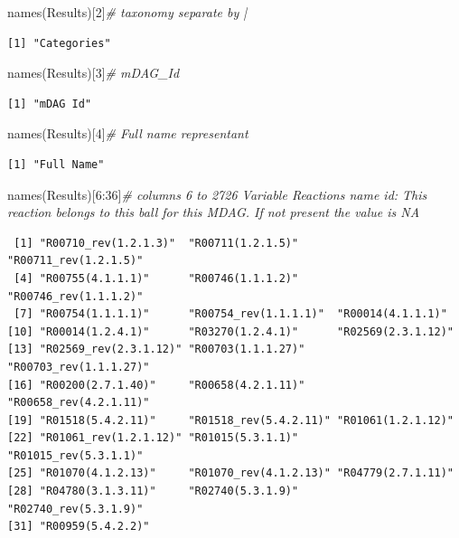 \documentclass[
  letterpaper,
  DIV=11,
  numbers=noendperiod]{scrreprt}
\newenvironment{Shaded}{}{}
\newcommand{\CommentTok}[1]{\textcolor[rgb]{0.36,0.39,0.44}{\textit{#1}}}
\newcommand{\DecValTok}[1]{\textcolor[rgb]{0.82,0.60,0.40}{#1}}
\newcommand{\FunctionTok}[1]{\textcolor[rgb]{0.38,0.69,0.94}{#1}}
\newcommand{\NormalTok}[1]{\textcolor[rgb]{0.67,0.70,0.75}{#1}}
\newcommand{\SpecialCharTok}[1]{\textcolor[rgb]{0.34,0.71,0.76}{#1}}
\begin{document}
\begin{Shaded}
\begin{Highlighting}[]
\FunctionTok{names}\NormalTok{(Results)[}\DecValTok{2}\NormalTok{]}\CommentTok{\# taxonomy separate by |}
\end{Highlighting}
\end{Shaded}

\begin{verbatim}
[1] "Categories"
\end{verbatim}

\begin{Shaded}
\begin{Highlighting}[]
\FunctionTok{names}\NormalTok{(Results)[}\DecValTok{3}\NormalTok{]}\CommentTok{\# mDAG\_Id }
\end{Highlighting}
\end{Shaded}

\begin{verbatim}
[1] "mDAG Id"
\end{verbatim}

\begin{Shaded}
\begin{Highlighting}[]
\FunctionTok{names}\NormalTok{(Results)[}\DecValTok{4}\NormalTok{]}\CommentTok{\# Full name representant}
\end{Highlighting}
\end{Shaded}

\begin{verbatim}
[1] "Full Name"
\end{verbatim}

\begin{Shaded}
\begin{Highlighting}[]
\FunctionTok{names}\NormalTok{(Results)[}\DecValTok{6}\SpecialCharTok{:}\DecValTok{36}\NormalTok{]}\CommentTok{\# columns 6 to 2726  Variable Reactions name id: This reaction belongs to this ball for this MDAG. If not present the value is NA}
\end{Highlighting}
\end{Shaded}

\begin{verbatim}
 [1] "R00710_rev(1.2.1.3)"  "R00711(1.2.1.5)"      "R00711_rev(1.2.1.5)" 
 [4] "R00755(4.1.1.1)"      "R00746(1.1.1.2)"      "R00746_rev(1.1.1.2)" 
 [7] "R00754(1.1.1.1)"      "R00754_rev(1.1.1.1)"  "R00014(4.1.1.1)"     
[10] "R00014(1.2.4.1)"      "R03270(1.2.4.1)"      "R02569(2.3.1.12)"    
[13] "R02569_rev(2.3.1.12)" "R00703(1.1.1.27)"     "R00703_rev(1.1.1.27)"
[16] "R00200(2.7.1.40)"     "R00658(4.2.1.11)"     "R00658_rev(4.2.1.11)"
[19] "R01518(5.4.2.11)"     "R01518_rev(5.4.2.11)" "R01061(1.2.1.12)"    
[22] "R01061_rev(1.2.1.12)" "R01015(5.3.1.1)"      "R01015_rev(5.3.1.1)" 
[25] "R01070(4.1.2.13)"     "R01070_rev(4.1.2.13)" "R04779(2.7.1.11)"    
[28] "R04780(3.1.3.11)"     "R02740(5.3.1.9)"      "R02740_rev(5.3.1.9)" 
[31] "R00959(5.4.2.2)"     
\end{verbatim}
\end{document}
